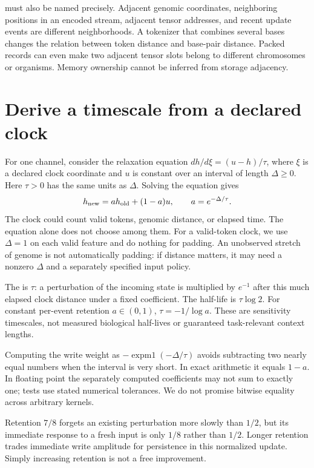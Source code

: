  must also be named precisely. Adjacent genomic coordinates,
neighboring positions in an encoded stream, adjacent tensor addresses, and
recent update events are different neighborhoods. A tokenizer that combines
several bases changes the relation between token distance and base-pair
distance. Packed records can even make two adjacent tensor slots belong to
different chromosomes or organisms. Memory ownership cannot be inferred
from storage adjacency.

\section{Derive a timescale from a declared clock}

For one channel, consider the relaxation equation
$dh/d\xi=(u-h)/\tau$, where $\xi$ is a declared clock coordinate and
$u$ is constant over an interval of length $\Delta\geq0$.
Here $\tau>0$ has the same units as $\Delta$. Solving the equation gives
\begin{equation}
 h_{\rm new}=a h_{\rm old}+(1-a)u,\qquad
 a=e^{-\Delta/\tau}.
 \label{eq:relax}
\end{equation}
The clock could count valid tokens, genomic distance, or elapsed time.
The equation alone does not choose among them. For a valid-token clock,
we use $\Delta=1$ on each valid feature and do nothing for padding.
An unobserved stretch of genome is not automatically padding: if distance
matters, it may need a nonzero $\Delta$ and a separately specified input policy.

The  is $\tau$: a perturbation of the incoming state is
multiplied by $e^{-1}$ after this much elapsed clock distance under a fixed
coefficient. The half-life is $\tau\log 2$. For constant per-event retention
$a\in(0,1)$, $\tau=-1/\log a$. These are sensitivity timescales, not measured
biological half-lives or guaranteed task-relevant context lengths.

Computing the write weight as $-\operatorname{expm1}(-\Delta/\tau)$ avoids
subtracting two nearly equal numbers when the interval is very short.
In exact arithmetic it equals $1-a$. In floating point the separately
computed coefficients may not sum to exactly one; tests use stated numerical
tolerances. We do not promise bitwise equality across arbitrary kernels.

\begin{center}\end{center}
Retention $7/8$ forgets an existing perturbation more slowly than $1/2$,
but its immediate response to a fresh input is only $1/8$ rather than $1/2$.
Longer retention trades immediate write amplitude for persistence in this
normalized update. Simply increasing retention is not a free improvement.

